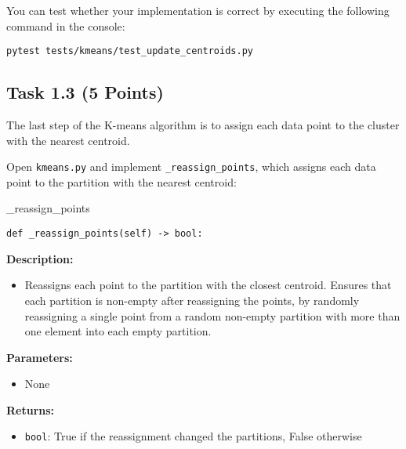 \documentclass[
english,
smallborders
]{i6prcsht}
\newcommand{\points}[1]{\hfill \color{red}(#1 Points)\color{black}}
\begin{document}
You can test whether your implementation is correct by executing the following command in the console:

\vspace*{0.3cm}

\begin{lstlisting}
pytest tests/kmeans/test_update_centroids.py
\end{lstlisting}

\newpage

\subsection*{Task 1.3 \points{5}}

The last step of the K-means algorithm is to assign each data point to the cluster with the nearest centroid. 

Open \texttt{kmeans.py} and implement \texttt{\_reassign\_points}, which assigns each data point to the partition with the nearest centroid:

\vspace*{0.3cm}

\begin{functionbox}{\_reassign\_points}
	\begin{lstlisting}[numbers=none]
def _reassign_points(self) -> bool:
\end{lstlisting}
	
	\textbf{Description:}
	\begin{itemize}[leftmargin=*,topsep=0pt]
		\item Reassigns each point to the partition with the closest centroid. Ensures that each partition is non-empty after reassigning the points, by randomly reassigning a single point from a random non-empty partition with more than one element into each empty partition.
	\end{itemize}
	
	\textbf{Parameters:}
	\begin{itemize}[leftmargin=*,topsep=0pt]
		\item None
	\end{itemize}
	
	\textbf{Returns:}
	\begin{itemize}[leftmargin=*,topsep=0pt]
		\item \texttt{bool}: True if the reassignment changed the partitions, False otherwise
	\end{itemize}
\end{functionbox}

\vspace*{0.5cm}
\end{document}
